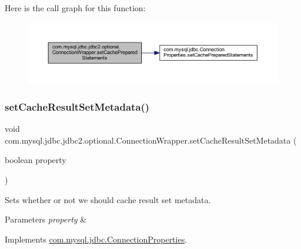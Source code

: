 Here is the call graph for this function\+:
\nopagebreak
\begin{figure}[H]
\begin{center}
\leavevmode
\includegraphics[width=350pt]{classcom_1_1mysql_1_1jdbc_1_1jdbc2_1_1optional_1_1_connection_wrapper_aa4df80c0af9ab1c8788c6d09d641d33b_cgraph}
\end{center}
\end{figure}
\mbox{\label{classcom_1_1mysql_1_1jdbc_1_1jdbc2_1_1optional_1_1_connection_wrapper_a549d3499e7fd8015aa2d761651d9f490}} 
\subsubsection{\texorpdfstring{set\+Cache\+Result\+Set\+Metadata()}{setCacheResultSetMetadata()}}
{\footnotesize\ttfamily void com.\+mysql.\+jdbc.\+jdbc2.\+optional.\+Connection\+Wrapper.\+set\+Cache\+Result\+Set\+Metadata (\begin{DoxyParamCaption}\item[{boolean}]{property }\end{DoxyParamCaption})}

Sets whether or not we should cache result set metadata.


\begin{DoxyParams}{Parameters}
{\em property} & \\
\hline
\end{DoxyParams}


Implements \mbox{\hyperlink{interfacecom_1_1mysql_1_1jdbc_1_1_connection_properties_abf45e0839d48fe28bb22d334118f807f}{com.\+mysql.\+jdbc.\+Connection\+Properties}}.

